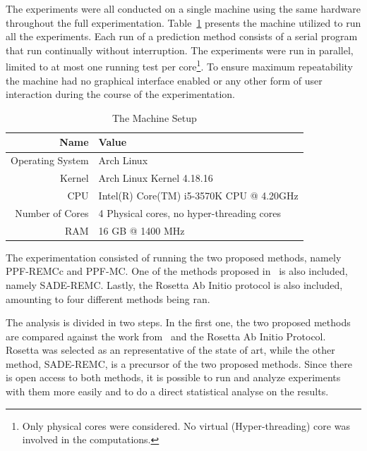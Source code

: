 The experiments were all conducted on a single machine using the same hardware
throughout the full experimentation. Table~\ref{tab:machine-setup}
presents the machine utilized to run all the experiments. Each run of a
prediction method consists of a serial program that run continually without
interruption. The experiments were run in parallel, limited to at most one
running test per core\footnote{Only physical cores were considered. No virtual
(Hyper-threading) core was involved in the computations.}. To ensure maximum
repeatability the machine had no graphical interface enabled or any other form
of user interaction during the course of the experimentation.

\begin{table}[th]
    \centering
    \begin{tabular}{r|l} \hline \hline
        Name & Value \\ \hline \hline
        Operating System & Arch Linux \\ \hline
        Kernel &  Arch Linux Kernel 4.18.16 \\ \hline
        CPU & Intel(R) Core(TM) i5-3570K CPU @ 4.20GHz \\ \hline
        Number of Cores & 4 Physical cores, no hyper-threading cores \\ \hline
        RAM & 16 GB @ 1400 MHz \\ \hline \hline
    \end{tabular}
    \caption{The Machine Setup}
    \label{tab:machine-setup}
\end{table}

The experimentation consisted of running the two proposed methods, namely
PPF-REMCc and PPF-MC. One of the methods proposed
in~\cite{silva2019self} is also included, namely SADE-REMC.
Lastly, the Rosetta Ab Initio protocol is also included, amounting to four
different methods being ran.

The analysis is divided in two steps. In the first one, the two proposed methods
are compared against the work from~ and the Rosetta Ab Initio
Protocol.
Rosetta was selected as an representative of the state of art,
while the other method, SADE-REMC, is a precursor of the two proposed methods.
Since there is open
access to both methods, it is possible to run and analyze experiments with them
more easily and to do a direct statistical analyse on the results.


